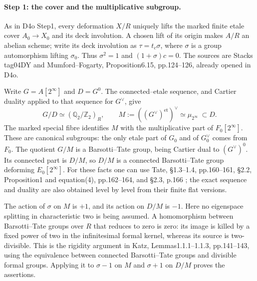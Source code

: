 \paragraph{Step 1: the cover and the multiplicative subgroup.}
As in D4o Step1, every deformation $X/R$ uniquely lifts the marked
finite etale cover $A_0\to X_0$ and its deck involution. A chosen lift
of its origin makes $A/R$ an abelian scheme; write its deck involution
as $\tau=t_c\sigma$, where $\sigma$ is a group automorphism lifting
$\sigma_0$. Thus $\sigma^2=1$ and $(1+\sigma)c=0$.
The sources are Stacks tag04DY and Mumford--Fogarty,
Proposition6.15, pp.124--126, already opened in D4o.

Write $G=A[2^\infty]$ and $D=G^0$. The connected--etale sequence,
and Cartier duality applied to that sequence for $G^\vee$, give
\[
 G/D\simeq (\mathbb Q_2/\mathbb Z_2)_R,
 \qquad M:=((G^\vee)^{\mathrm{et}})^\vee
       \simeq\mu_{2^\infty}\ \subset D.                 \tag{S2}
\]
The marked special fibre identifies $M$ with the multiplicative
part of $F_0[2^\infty]$. These are canonical subgroups: the only
etale part of $G_0$ and of $G_0^\vee$ comes from $F_0$.
The quotient $G/M$ is a Barsotti--Tate group, being Cartier dual to
$(G^\vee)^0$. Its connected part is $D/M$, so $D/M$ is a connected
Barsotti--Tate group deforming $E_0[2^\infty]$.
For these facts one can use Tate, \S1.3--1.4, pp.160--161,
\S2.2, Proposition1 and equation(4), pp.162--164, and
\S2.3, p.166 \cite{DGJ_Tate1967}; the exact sequence and duality
are also obtained level by level from their finite flat versions.

The action of $\sigma$ on $M$ is $+1$, and its action on $D/M$ is
$-1$. Here no eigenspace splitting in characteristic two is being
assumed. A homomorphism between Barsotti--Tate groups over $R$ that
reduces to zero is zero: its image is killed by a fixed power of two
in the infinitesimal formal kernel, whereas its source is two-divisible.
This is the rigidity argument in Katz, Lemmas1.1.1--1.1.3,
pp.141--143, using the equivalence between connected Barsotti--Tate
groups and divisible formal groups. Applying it to $\sigma-1$ on
$M$ and $\sigma+1$ on $D/M$ proves the assertions.

